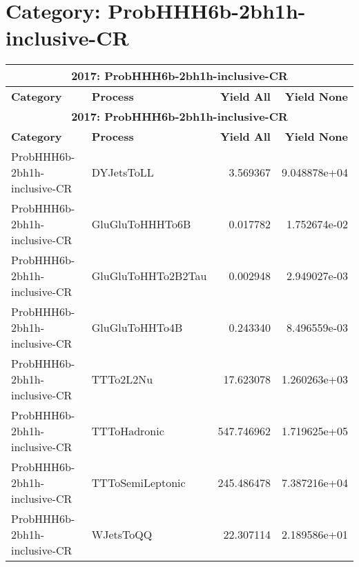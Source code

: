 \documentclass{article}
\begin{document}
\section*{Category: ProbHHH6b-2bh1h-inclusive-CR}
\begin{longtable}[c]{|l|l|r|r|}
\hline
\multicolumn{4}{|c|}{\textbf{2017: ProbHHH6b-2bh1h-inclusive-CR}} \\
\hline
\textbf{Category} & \textbf{Process} & \textbf{Yield All} & \textbf{Yield None} \\
\hline
\endfirsthead
\hline
\multicolumn{4}{|c|}{\textbf{2017: ProbHHH6b-2bh1h-inclusive-CR}} \\
\hline
\textbf{Category} & \textbf{Process} & \textbf{Yield All} & \textbf{Yield None} \\
\hline
\endhead
ProbHHH6b-2bh1h-inclusive-CR & DYJetsToLL & 3.569367 & 9.048878e+04 \\
\hline
ProbHHH6b-2bh1h-inclusive-CR & GluGluToHHHTo6B & 0.017782 & 1.752674e-02 \\
\hline
ProbHHH6b-2bh1h-inclusive-CR & GluGluToHHTo2B2Tau & 0.002948 & 2.949027e-03 \\
\hline
ProbHHH6b-2bh1h-inclusive-CR & GluGluToHHTo4B & 0.243340 & 8.496559e-03 \\
\hline
ProbHHH6b-2bh1h-inclusive-CR & TTTo2L2Nu & 17.623078 & 1.260263e+03 \\
\hline
ProbHHH6b-2bh1h-inclusive-CR & TTToHadronic & 547.746962 & 1.719625e+05 \\
\hline
ProbHHH6b-2bh1h-inclusive-CR & TTToSemiLeptonic & 245.486478 & 7.387216e+04 \\
\hline
ProbHHH6b-2bh1h-inclusive-CR & WJetsToQQ & 22.307114 & 2.189586e+01 \\
\hline
\end{longtable}
\end{document}
